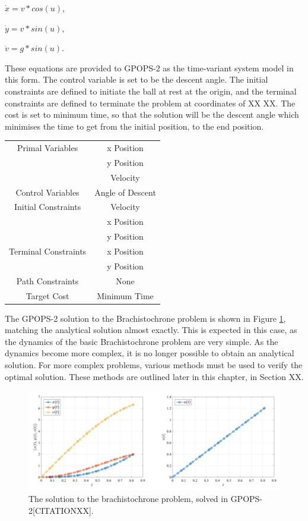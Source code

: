 $\dot{x} = v*cos(u)$,

$\dot{y} = v*sin(u)$,

$\dot{v} = g*sin(u)$.

\noindent These equations are provided to GPOPS-2 as the time-variant system model in this form. The control variable is set to be the descent angle. The initial constraints are defined to initiate the ball at rest at the origin, and the terminal constraints are defined to terminate the problem at coordinates of XX XX. The cost is set to minimum time, so that the solution will be the descent angle which minimises the time to get from the initial position, to the end position. 

\begin{table}
	\centering
	\begin{tabular}{|c|c|}
		\hline Primal Variables  & x Position\\& y Position\\& Velocity\\ 
		\hline Control Variables  & Angle of Descent\\ 
		\hline Initial Constraints  & Velocity\\ & x Position\\ & y Position\\
		\hline Terminal Constraints &  x Position\\ & y Position\\
		\hline Path Constraints & None \\ 
		\hline Target Cost & Minimum Time \\ 
		\hline 
	\end{tabular} 
\end{table}


The GPOPS-2 solution to the Brachistochrone problem is shown in Figure \ref{fig:Brachistochrone}, matching the analytical solution almost exactly. This is expected in this case, as the dynamics of the basic Brachistochrone problem are very simple. As the dynamics become more complex, it is no longer possible to obtain an analytical solution. For more complex problems, various methods must be used to verify the optimal solution. These methods are outlined later in this chapter, in Section XX.  

\begin{figure}[ht]
	\centering
	\includegraphics[width=0.9\linewidth]{figures/4_LODESTAR/Brachistochrone}
	\caption{The solution to the brachistochrone problem, solved in GPOPS-2[CITATIONXX].}
	\label{fig:Brachistochrone}
\end{figure}


